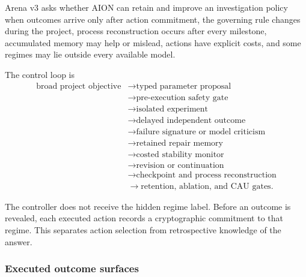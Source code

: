 Arena v3 asks whether AION can retain and improve an investigation policy when
outcomes arrive only after action commitment, the governing rule changes during
the project, process reconstruction occurs after every milestone, accumulated
memory may help or mislead, actions have explicit costs, and some regimes may
lie outside every available model.

The control loop is
\begin{equation}
\begin{split}
\text{broad project objective}
&\rightarrow \text{typed parameter proposal} \\
&\rightarrow \text{pre-execution safety gate} \\
&\rightarrow \text{isolated experiment} \\
&\rightarrow \text{delayed independent outcome} \\
&\rightarrow \text{failure signature or model criticism} \\
&\rightarrow \text{retained repair memory} \\
&\rightarrow \text{costed stability monitor} \\
&\rightarrow \text{revision or continuation} \\
&\rightarrow \text{checkpoint and process reconstruction} \\
&\rightarrow \text{retention, ablation, and CAU gates}.
\end{split}
\label{eq:arena-v3-loop}
\end{equation}

The controller does not receive the hidden regime label.  Before an outcome is
revealed, each executed action records a cryptographic commitment to that
regime.  This separates action selection from retrospective knowledge of the
answer.


\subsubsection{Executed outcome surfaces}

